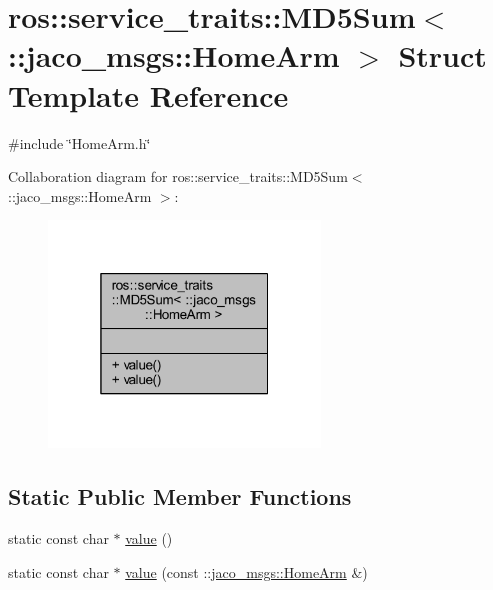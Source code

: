 \hypertarget{structros_1_1service__traits_1_1MD5Sum_3_01_1_1jaco__msgs_1_1HomeArm_01_4}{}\section{ros\+:\+:service\+\_\+traits\+:\+:M\+D5\+Sum$<$ \+:\+:jaco\+\_\+msgs\+:\+:Home\+Arm $>$ Struct Template Reference}
\label{structros_1_1service__traits_1_1MD5Sum_3_01_1_1jaco__msgs_1_1HomeArm_01_4}


{\ttfamily \#include \char`\"{}Home\+Arm.\+h\char`\"{}}



Collaboration diagram for ros\+:\+:service\+\_\+traits\+:\+:M\+D5\+Sum$<$ \+:\+:jaco\+\_\+msgs\+:\+:Home\+Arm $>$\+:
\nopagebreak
\begin{figure}[H]
\begin{center}
\leavevmode
\includegraphics[width=205pt]{de/d78/structros_1_1service__traits_1_1MD5Sum_3_01_1_1jaco__msgs_1_1HomeArm_01_4__coll__graph}
\end{center}
\end{figure}
\subsection*{Static Public Member Functions}
\begin{DoxyCompactItemize}
\item 
static const char $\ast$ \hyperlink{structros_1_1service__traits_1_1MD5Sum_3_01_1_1jaco__msgs_1_1HomeArm_01_4_a1bceb87f47cdef0e474c63b48092c539}{value} ()
\item 
static const char $\ast$ \hyperlink{structros_1_1service__traits_1_1MD5Sum_3_01_1_1jaco__msgs_1_1HomeArm_01_4_a811a3c8cf1fd7fb653fe3b42212a676b}{value} (const \+::\hyperlink{namespacejaco__msgs_d2/d3e/structjaco__msgs_1_1HomeArm}{jaco\+\_\+msgs\+::\+Home\+Arm} \&)
\end{DoxyCompactItemize}


